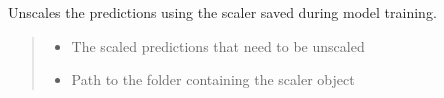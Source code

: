 \documentclass[letterpaper,10pt,english]{sphinxmanual}
\begin{document}
\begin{fulllineitems}
\begin{fulllineitems}
\begin{quote}
\begin{description}
\end{description}\end{quote}

\end{fulllineitems}


\begin{fulllineitems}
\label{\detokenize{docs/ARIMA_model:ARIMA_model.ARIMA_Predictor.unscale_predictions}}
\pysigstartsignatures
{}
\pysigstopsignatures
\sphinxAtStartPar
Unscales the predictions using the scaler saved during model training.
\begin{quote}\begin{description}
\begin{itemize}
\item {} 
\sphinxAtStartPar
{} \textendash{} The scaled predictions that need to be unscaled

\item {} 
\sphinxAtStartPar
{} \textendash{} Path to the folder containing the scaler object

\end{itemize}

\end{description}\end{quote}

\end{fulllineitems}


\end{fulllineitems}


\sphinxstepscope
\end{document}
